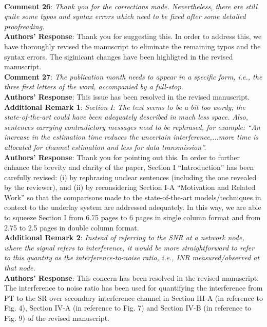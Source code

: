 \documentclass[12pt,a4wide,peerreview]{IEEEtran}
\begin{document}
\\
\textbf{Comment 26}:
\textit{
Thank you for the corrections made. Nevertheless, there are still quite some typos and syntax errors which need to be fixed after some detailed proofreading.
}
\\
\textbf{Authors' Response}: 
Thank you for suggesting this. In order to address this, we have thoroughly revised the manuscript to eliminate the remaining typos and the syntax errors. The siginicant changes have been highligted in the revised manuscript. 
\\
\textbf{Comment 27}:
\textit{
The publication month needs to appear in a specific form, i.e., the three first letters of the word, accompanied by a full-stop.
}
\\
\textbf{Authors' Response}: 
This issue has been resolved in the revised manuscript. 
\\
\textbf{Additional Remark 1}:
\textit{Section I: The text seems to be a bit too wordy; the state-of-the-art could have been adequately described in much less space. Also, sentences carrying contradictory messages need to be rephrased, for example: ``An increase in the estimation time reduces the uncertain interference,...more time is allocated for channel estimation and less for data transmission''.
}
\\
\textbf{Authors' Response}: 
Thank you for pointing out this. In order to further enhance the brevity and clarity of the paper, Section I ``Introduction'' has been carefully revised:  (i) by rephrasing unclear sentences (including the one revealed by the reviewer), and (ii) by reconsidering Section I-A ``Motivation and Related Work'' so that the comparisons made to the state-of-the-art models/techniques in context to the underlay system are addressed adequately. In this way, we are able to squeeze Section I from 6.75 pages to 6 pages in single column format and from 2.75 to 2.5 pages in double column format. 
\\
\textbf{Additional Remark 2}:
\textit{
 Instead of referring to the SNR at a network node, where the signal refers to interference, it would be more straightforward to refer to this quantity as the interference-to-noise ratio, i.e., INR measured/observed at that node.
}
\\
\textbf{Authors' Response}: 
This concern has been resolved in the revised manuscript. The interference to noise ratio has been used for quantifying the interference from PT to the SR over secondary interference channel in Section III-A (in reference to Fig. 4), Section IV-A (in reference to Fig. 7) and Section IV-B (in reference to Fig. 9) of the revised manuscript. 
\end{document}
